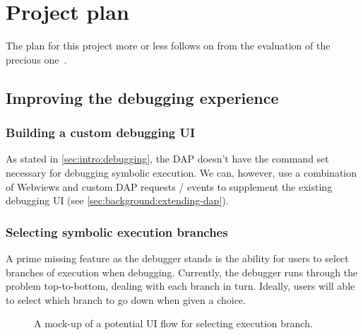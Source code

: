 \chapter{Project plan}
\label{cha:plan}

The plan for this project more or less follows on from the evaluation of the
precious one~\cite{gillian-debugging-2021}.

\section{Improving the debugging experience}

\subsection{Building a custom debugging UI}

As stated in \autoref{sec:intro:debugging}, the DAP doesn't have the command
set necessary for debugging symbolic execution. We can, however, use a
combination of Webviews and custom DAP requests / events to supplement the
existing debugging UI (see \autoref{sec:background:extending-dap}).

\subsection{Selecting symbolic execution branches}

A prime missing feature as the debugger stands is the ability for users to
select branches of execution when debugging. Currently, the debugger runs
through the problem top-to-bottom, dealing with each branch in turn. Ideally,
users will able to select which branch to go down when given a choice.

\begin{figure}
  \noindent
  \caption{A mock-up of a potential UI flow for selecting execution branch.}
  \label{fig:branch-selection-mockup}
\end{figure}

